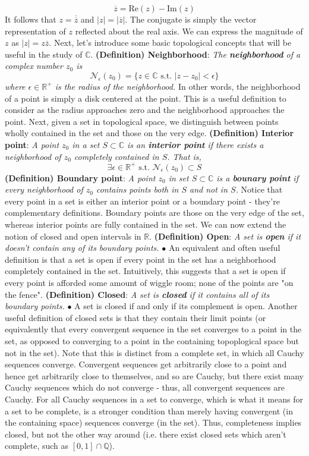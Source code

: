 \documentclass{article}
\newcommand*{\tb}{\textbf}
\newcommand*{\ti}{\textit}
\newcommand*{\n}{\newline}
\newcommand*{\nn}{\newline \newline}
\newcommand*{\R}{\mathbb{R}}
\newcommand*{\C}{\mathbb{C}}
\newcommand*{\st}{\text{ s.t. }}
\begin{document}
$$ \overline{z} = \text{Re}(z) - \text{Im}(z) $$
It follows that $ z = \overline{\overline{z}} $ and $ | z | = | \overline{z} | $. The conjugate is simply the vector representation of $ z $ reflected about the real axis. We can express the magnitude of $ z $ as $ | z | = z \overline{z} $.
\n
Next, let's introduce some basic topological concepts that will be useful in the study of $ \C $.
\nn
\tb{(Definition) Neighborhood}: \ti{The \tb{neighborhood} of a complex number $ z_0 $ is}
$$ \mathcal{N}_\epsilon(z_0) = \{ z \in \C \st | z - z_0 | < \epsilon \} $$
\indent \ti{where $ \epsilon \in \R^+ $ is the radius of the neighborhood.}
\nn
In other words, the neighborhood of a point is simply a disk centered at the point. This is a useful definition to consider as the radius approaches zero and the neighborhood approaches the point. Next, given a set in topological space, we distinguish between points wholly contained in the set and those on the very edge.
\nn
\tb{(Definition) Interior point}: \ti{A point $ z_0 $ in a set $ S \subset \C $ is an \tb{interior point} if there exists a neighborhood of $ z_0 $ completely contained in $ S $. That is,}
$$ \exists \epsilon \in \R^+ \st \mathcal{N}_\epsilon(z_0) \subset S $$
\tb{(Definition) Boundary point}: \ti{A point $ z_0 $ in set $ S \subset \C $ is a \tb{bounary point} if every neighborhood of $ z_0 $ contains points both in $ S $ and not in $ S $.}
\nn
Notice that every point in a set is either an interior point or a boundary point - they're complementary definitions. Boundary points are those on the very edge of the set, whereas interior points are fully contained in the set. We can now extend the notion of closed and open intervals in $ \R $.
\nn
\tb{(Definition) Open}: \ti{A set is \tb{open} if it doesn't contain any of its boundary points.}
\n
\indent $ \bullet $ An equivalent and often useful definition is that a set is open if every point in the set has a neighborhood completely contained in the set. Intuitively, this suggests that a set is open if every point is afforded some amount of wiggle room; none of the points are "on the fence".
\nn
\tb{(Definition) Closed}: \ti{A set is \tb{closed} if it contains all of its boundary points.}
\n
\indent $ \bullet $ A set is closed if and only if its complement is open. Another useful definition of closed sets is that they contain their limit points (or equivalently that every convergent sequence in the set converges to a point in the set, as opposed to converging to a point in the containing topoplogical space but not in the set). Note that this is distinct from a complete set, in which all Cauchy sequences converge. Convergent sequences get arbitrarily close to a point and hence get arbitrarily close to themselves, and so are Cauchy, but there exist many Cauchy sequences which do not converge - thus, all convergent sequences are Cauchy. For all Cauchy sequences in a set to converge, which is what it means for a set to be complete, is a stronger condition than merely having convergent (in the containing space) sequences converge (in the set). Thus, completeness implies closed, but not the other way around (i.e. there exist closed sets which aren't complete, such as $ [ 0, 1 ] \cap \mathbb{Q} $).
\end{document}
